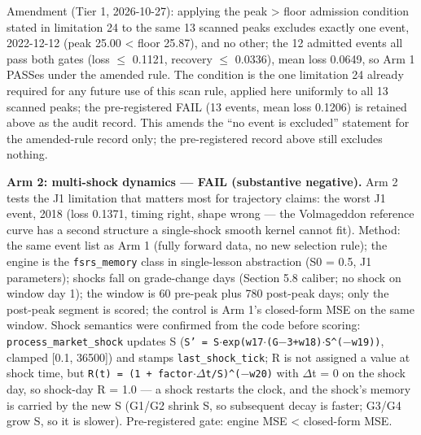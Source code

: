 \documentclass[11pt]{article}
\begin{document}
Amendment (Tier 1, 2026-10-27): applying the peak > floor admission condition stated in limitation 24 to the same 13 scanned peaks excludes exactly one event, 2022-12-12 (peak 25.00 < floor 25.87), and no other; the 12 admitted events all pass both gates (loss $\leq$ 0.1121, recovery $\leq$ 0.0336), mean loss 0.0649, so Arm 1 PASSes under the amended rule. The condition is the one limitation 24 already required for any future use of this scan rule, applied here uniformly to all 13 scanned peaks; the pre-registered FAIL (13 events, mean loss 0.1206) is retained above as the audit record. This amends the “no event is excluded” statement for the amended-rule record only; the pre-registered record above still excludes nothing.

\textbf{Arm 2: multi-shock dynamics --- FAIL (substantive negative).} Arm 2 tests the J1 limitation that matters most for trajectory claims: the worst J1 event, 2018 (loss 0.1371, timing right, shape wrong --- the Volmageddon reference curve has a second structure a single-shock smooth kernel cannot fit). Method: the same event list as Arm 1 (fully forward data, no new selection rule); the engine is the \texttt{fsrs\_memory} class in single-lesson abstraction (S0 = 0.5, J1 parameters); shocks fall on grade-change days (Section 5.8 caliber; no shock on window day 1); the window is 60 pre-peak plus 780 post-peak days; only the post-peak segment is scored; the control is Arm 1's closed-form MSE on the same window. Shock semantics were confirmed from the code before scoring: \texttt{process\_market\_shock} updates S (\texttt{S' = S$\cdot$exp(w17$\cdot$(G$-$3+w18)$\cdot$S\^{}($-$w19))}, clamped [0.1, 36500]) and stamps \texttt{last\_shock\_tick}; R is not assigned a value at shock time, but \texttt{R(t) = (1 + factor$\cdot$$\Delta$t/S)\^{}($-$w20)} with $\Delta$t = 0 on the shock day, so shock-day R = 1.0 --- a shock restarts the clock, and the shock's memory is carried by the new S (G1/G2 shrink S, so subsequent decay is faster; G3/G4 grow S, so it is slower). Pre-registered gate: engine MSE < closed-form MSE.
\end{document}
